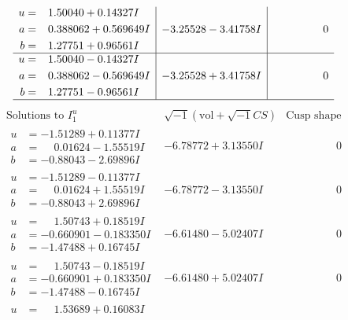 \documentclass[1p]{elsarticle_modified}
\theoremstyle{definition}
\newcommand{\I}{\sqrt{-1}}
\begin{document}
$$\begin{array}{c|c|c}
\begin{aligned}
u &= \phantom{-}1.50040 + 0.14327 I \\
a &= \phantom{-}0.388062 + 0.569649 I \\
b &= \phantom{-}1.27751 + 0.96561 I\end{aligned}
 & -3.25528 - 3.41758 I & \phantom{-0.000000 } 0 \\ \hline\begin{aligned}
u &= \phantom{-}1.50040 - 0.14327 I \\
a &= \phantom{-}0.388062 - 0.569649 I \\
b &= \phantom{-}1.27751 - 0.96561 I\end{aligned}
 & -3.25528 + 3.41758 I & \phantom{-0.000000 } 0\\
 \hline 
 \end{array}$$\newpage$$\begin{array}{c|c|c}  
\text{Solutions to }I^u_{1}& \I (\text{vol} + \sqrt{-1}CS) & \text{Cusp shape}\\
 \hline 
\begin{aligned}
u &= -1.51289 + 0.11377 I \\
a &= \phantom{-}0.01624 - 1.55519 I \\
b &= -0.88043 - 2.69896 I\end{aligned}
 & -6.78772 + 3.13550 I & \phantom{-0.000000 } 0 \\ \hline\begin{aligned}
u &= -1.51289 - 0.11377 I \\
a &= \phantom{-}0.01624 + 1.55519 I \\
b &= -0.88043 + 2.69896 I\end{aligned}
 & -6.78772 - 3.13550 I & \phantom{-0.000000 } 0 \\ \hline\begin{aligned}
u &= \phantom{-}1.50743 + 0.18519 I \\
a &= -0.660901 - 0.183350 I \\
b &= -1.47488 + 0.16745 I\end{aligned}
 & -6.61480 - 5.02407 I & \phantom{-0.000000 } 0 \\ \hline\begin{aligned}
u &= \phantom{-}1.50743 - 0.18519 I \\
a &= -0.660901 + 0.183350 I \\
b &= -1.47488 - 0.16745 I\end{aligned}
 & -6.61480 + 5.02407 I & \phantom{-0.000000 } 0 \\ \hline\begin{aligned}
u &= \phantom{-}1.53689 + 0.16083 I \\

\end{aligned}
\end{array}$$
\end{document}

